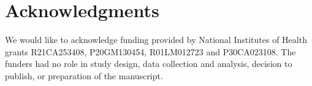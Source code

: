 \documentclass[10pt,letterpaper]{article}
\begin{document}


\section*{Acknowledgments}
We would like to acknowledge funding provided by National Institutes of Health grants R21CA253408, P20GM130454, R01LM012723 and P30CA023108. The funders had no role in study design, data collection and analysis, decision to publish, or preparation of the manuscript.

\nolinenumbers




\end{document}
